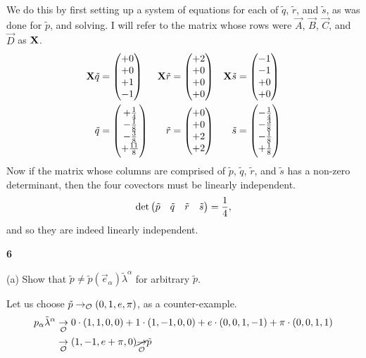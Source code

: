 \documentclass[gr-notes.tex]{subfiles}
\begin{document}
We do this by first setting up a system of equations for each of $\tilde{q}$, $\tilde{r}$, and $\tilde{s}$, as was done for $\tilde{p}$, and solving. I will refer to the matrix whose rows were $\vec{A}$, $\vec{B}$, $\vec{C}$, and $\vec{D}$ as $\vb{X}$.
%
\begin{align*}
  \vb{X} \tilde{q} &= \mqty( +0 \\ +0 \\ +1 \\ -1 ) &
  \vb{X} \tilde{r} &= \mqty( +2 \\ +0 \\ +0 \\ +0 ) &
  \vb{X} \tilde{s} &= \mqty( -1 \\ -1 \\ +0 \\ +0 )
  \\
  \tilde{q} &=
  \mqty( +\frac{1}{4} \\ -\frac{1}{8} \\ -\frac{3}{8} \\ +\frac{11}{8} ) &
  \tilde{r} &=
  \mqty( +0 \\ +0 \\ +2 \\ +2 ) &
  \tilde{s} &=
  \mqty( -\frac{1}{4} \\ -\frac{3}{8} \\ -\frac{1}{8} \\ +\frac{1}{8} )
\end{align*}
%
Now if the matrix whose columns are comprised of $\tilde{p}$, $\tilde{q}$, $\tilde{r}$, and $\tilde{s}$ has a non-zero determinant, then the four covectors must be linearly independent.
%
\begin{displaymath}
  \det \mqty( \tilde{p} & \tilde{q} & \tilde{r} & \tilde{s} ) = \frac{1}{4},
\end{displaymath}
%
and so they are indeed linearly independent.


\textbf{6}

(a) Show that $\tilde{p} \neq \tilde{p}(\vec{e}_\alpha) \tilde{\lambda}^\alpha$ for arbitrary $\tilde{p}$.

Let us choose $\tilde{p} \to_{\mathcal{O}} (0, 1, e, \pi)$, as a counter-example.
%
\begin{align*}
  p_\alpha \tilde{\lambda}^\alpha &\underset{\mathcal{O}}{\to}
  0 \cdot (1, 1, 0, 0) +
  1 \cdot (1, -1, 0, 0) +
  e \cdot (0, 0, 1, -1) +
  \pi \cdot (0, 0, 1, 1)
  \\ &\underset{\mathcal{O}}{\to}
  (1, -1, e+\pi, 0)
  \underset{\mathcal{O}}{\cancel\to}
  \tilde{p}
\end{align*}
\end{document}
